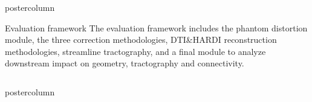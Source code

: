 \documentclass[final,hyperref={pdfpagelabels=false}]{beamer}
\newlength{\columnheight}
\begin{document}
\begin{frame}[t]
{\begin{minipage}[t][\columnheight][c]{0.95\textwidth}
{\begin{columns}[t,totalwidth=\textwidth]
\begin{column}{.64\linewidth}
\begin{beamercolorbox}[center,wd=\textwidth]{postercolumn}
\begin{minipage}[T]{.95\textwidth}
{\begin{block}{Evaluation framework}
          The evaluation framework includes the phantom distortion module, the three correction
          methodologies, DTI\&HARDI reconstruction methodologies, streamline tractography,
          and a final module to analyze downstream impact on geometry, tractography and connectivity.
          \end{block}
          }
        \end{minipage}
      \end{beamercolorbox}
    \end{column}
  \end{columns}
  \vfill
  \noindent{}
  \vfill
  \begin{columns}[T,totalwidth=\textwidth]
    \begin{column}{.34\textwidth}
      \begin{beamercolorbox}[center,wd=\textwidth]{postercolumn}
        \begin{minipage}[T]{\textwidth}  %
          \noindent\parbox[t]{\textwidth}{ %
}
\end{minipage}
\end{beamercolorbox}
\end{column}
\end{columns}}
\end{minipage}}
\end{frame}
\end{document}
